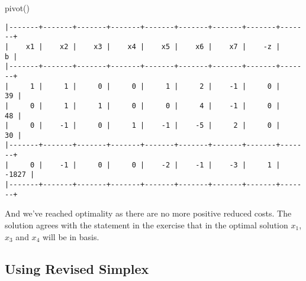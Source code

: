 \documentclass[
  letterpaper,
  DIV=11,
  numbers=noendperiod]{scrartcl}
\newenvironment{Shaded}{\begin{snugshade}}{\end{snugshade}}
\newcommand{\NormalTok}[1]{\textcolor[rgb]{0.00,0.23,0.31}{#1}}
\begin{document}
\begin{Shaded}
\begin{Highlighting}[]
\NormalTok{pivot()}
\end{Highlighting}
\end{Shaded}

\begin{verbatim}
|-------+-------+-------+-------+-------+-------+-------+-------+-------+
|    x1 |    x2 |    x3 |    x4 |    x5 |    x6 |    x7 |    -z |     b |
|-------+-------+-------+-------+-------+-------+-------+-------+-------+
|     1 |     1 |     0 |     0 |     1 |     2 |    -1 |     0 |    39 |
|     0 |     1 |     1 |     0 |     0 |     4 |    -1 |     0 |    48 |
|     0 |    -1 |     0 |     1 |    -1 |    -5 |     2 |     0 |    30 |
|-------+-------+-------+-------+-------+-------+-------+-------+-------+
|     0 |    -1 |     0 |     0 |    -2 |    -1 |    -3 |     1 | -1827 |
|-------+-------+-------+-------+-------+-------+-------+-------+-------+
\end{verbatim}

And we've reached optimality as there are no more positive reduced
costs. The solution agrees with the statement in the exercise that in
the optimal solution \(x_1\), \(x_3\) and \(x_4\) will be in basis.

\subsection{Using Revised Simplex}\label{using-revised-simplex}
\end{document}
